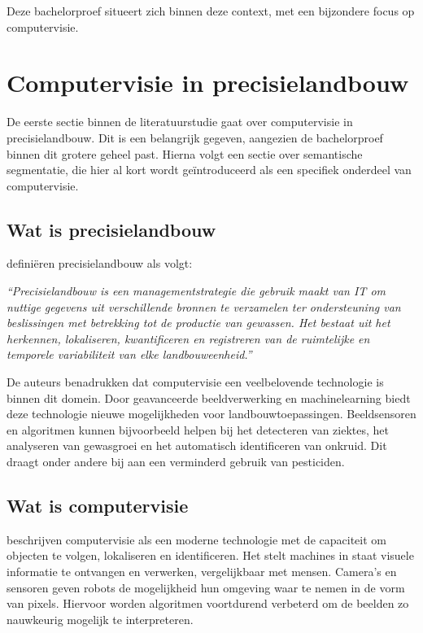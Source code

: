 Deze bachelorproef situeert zich binnen deze context, met een bijzondere focus op computervisie.

\section{Computervisie in precisielandbouw}

De eerste sectie binnen de literatuurstudie gaat over computervisie in precisielandbouw. Dit is een belangrijk gegeven, aangezien de bachelorproef binnen dit grotere geheel past. Hierna volgt een sectie over semantische segmentatie, die hier al kort wordt geïntroduceerd als een specifiek onderdeel van computervisie.

\subsection{Wat is precisielandbouw}
\textcite{Cisternas2020} definiëren precisielandbouw als volgt: 

\begin{tcolorbox}[colback=gray!5, colframe=white, sharp corners, boxrule=0pt, width=\linewidth]
    \textit{“Precisielandbouw is een managementstrategie die gebruik maakt van IT om nuttige gegevens uit verschillende bronnen te verzamelen ter ondersteuning van beslissingen met betrekking tot de productie van gewassen. Het bestaat uit het herkennen, lokaliseren, kwantificeren en registreren van de ruimtelijke en temporele variabiliteit van elke landbouweenheid.”} 
\end{tcolorbox}

De auteurs benadrukken dat computervisie een veelbelovende technologie is binnen dit domein. Door geavanceerde beeldverwerking en machinelearning biedt deze technologie nieuwe mogelijkheden voor landbouwtoepassingen. Beeldsensoren en algoritmen kunnen bijvoorbeeld helpen bij het detecteren van ziektes, het analyseren van gewasgroei en het automatisch identificeren van onkruid. Dit draagt onder andere bij aan een verminderd gebruik van pesticiden.

\subsection{Wat is computervisie}
\textcite{Radojcic2023} beschrijven computervisie als een moderne technologie met de capaciteit om objecten te volgen, lokaliseren en identificeren. Het stelt machines in staat visuele informatie te ontvangen en verwerken, vergelijkbaar met mensen. Camera’s en sensoren geven robots de mogelijkheid hun omgeving waar te nemen in de vorm van pixels. Hiervoor worden algoritmen voortdurend verbeterd om de beelden zo nauwkeurig mogelijk te interpreteren. 

